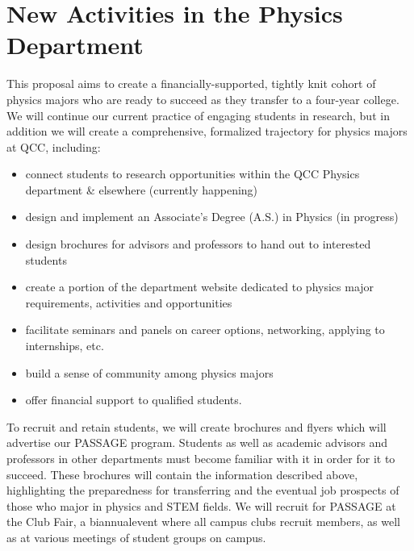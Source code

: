 \documentclass[12pt]{article}
\begin{document}
\section{\large{New Activities in the Physics Department}}
\vspace{-3mm}
This proposal aims to create a financially-supported, tightly knit cohort of physics majors who are ready to succeed as they transfer to a four-year college.  We will continue our current practice of engaging students in research, but in addition we will  create a comprehensive, formalized trajectory for physics majors at QCC, including:
\vspace{-2mm}

\begin{itemize}
\setlength{\itemsep}{-\parsep}
\setlength{\topsep}{-\parsep}
\setlength{\partopsep}{-\parsep}
	\item connect students to research opportunities within the QCC Physics department \& elsewhere (currently happening)
	\item design and implement an Associate's Degree (A.S.) in Physics (in progress)
	\item design brochures for advisors and professors to hand out to interested students
	\item create a portion of the department website dedicated to physics major requirements, activities and opportunities
	\item facilitate seminars and panels on career options, networking, applying to internships, etc.
	\item build a sense of community among physics majors 
	\item offer financial support to qualified students.	
\end{itemize}	
	\vspace{-1mm}
To recruit and retain students, we will create brochures and flyers which will advertise our PASSAGE program.  Students as well as academic advisors and professors in other departments must become familiar with it in order for it to succeed.  These brochures will contain the information described above, highlighting the preparedness for transferring and the eventual job prospects of those who major in physics and STEM fields.  We will recruit for PASSAGE at the Club Fair, a biannualevent where all campus clubs recruit members, as well as at various meetings of student groups on campus.
\end{document}
